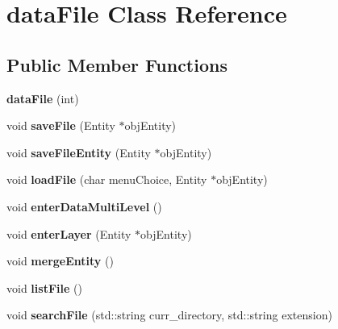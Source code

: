 \hypertarget{classdataFile}{}\section{data\+File Class Reference}
\label{classdataFile}
\subsection*{Public Member Functions}
\begin{DoxyCompactItemize}
\item 
{\bfseries data\+File} (int)\hypertarget{classdataFile_a36da8680b7f982e1986febadcfc8a993}{}\label{classdataFile_a36da8680b7f982e1986febadcfc8a993}

\item 
void {\bfseries save\+File} (Entity $\ast$obj\+Entity)\hypertarget{classdataFile_abecd75f573fba66a2c9628ce87854e6f}{}\label{classdataFile_abecd75f573fba66a2c9628ce87854e6f}

\item 
void {\bfseries save\+File\+Entity} (Entity $\ast$obj\+Entity)\hypertarget{classdataFile_a279559203328e137390324c970ca73a8}{}\label{classdataFile_a279559203328e137390324c970ca73a8}

\item 
void {\bfseries load\+File} (char menu\+Choice, Entity $\ast$obj\+Entity)\hypertarget{classdataFile_a5f79be795a642103f7f5237e4a993095}{}\label{classdataFile_a5f79be795a642103f7f5237e4a993095}

\item 
void {\bfseries enter\+Data\+Multi\+Level} ()\hypertarget{classdataFile_a9f8591db2f0f5d30127f155939317263}{}\label{classdataFile_a9f8591db2f0f5d30127f155939317263}

\item 
void {\bfseries enter\+Layer} (Entity $\ast$obj\+Entity)\hypertarget{classdataFile_a2deda89d8d47013411f8a8007c028452}{}\label{classdataFile_a2deda89d8d47013411f8a8007c028452}

\item 
void {\bfseries merge\+Entity} ()\hypertarget{classdataFile_a1ce228b310611165bbf337ded852b814}{}\label{classdataFile_a1ce228b310611165bbf337ded852b814}

\item 
void {\bfseries list\+File} ()\hypertarget{classdataFile_a18acf1cd75965ca6602d8826e1d78ce8}{}\label{classdataFile_a18acf1cd75965ca6602d8826e1d78ce8}

\item 
void {\bfseries search\+File} (std\+::string curr\+\_\+directory, std\+::string extension)\hypertarget{classdataFile_ac3fa8d25348687cc0b2cd4f162ca1fea}{}\label{classdataFile_ac3fa8d25348687cc0b2cd4f162ca1fea}


\end{DoxyCompactItemize}
